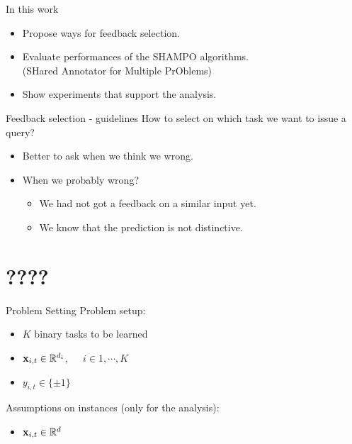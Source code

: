 \documentclass{beamer}
\begin{document}
\begin{frame}{In this work}
\begin{itemize}
\item Propose  ways for feedback selection.   \newline
\item Evaluate  performances of the SHAMPO algorithms. \\
(SHared Annotator for Multiple PrOblems) \newline
\item Show experiments that support the analysis.\newline
\end{itemize}
\end{frame}


\begin{frame}{Feedback selection - guidelines}
How to select on which task we want to issue a query?\newline 
\begin{itemize}
\item Better to ask when we think we wrong.\newline
\item When we probably wrong?\newline
\begin{itemize}
\item We had not got a feedback on a similar input yet.\newline
\item We know  that the prediction is not distinctive.
\end{itemize}
\end{itemize}
\end{frame}

\section{????}

\begin{frame}{Problem Setting}
Problem setup:\newline
\begin{itemize}
\item $K$ binary tasks to be learned \newline
\item $\mathbf{x}_{i,t}\in \mathbb{R}^{d_i}$,~~~$i\in{1,\cdots,K}$\newline
\item $y_{i,t}\in\{\pm1\}$\newline
\end{itemize}
Assumptions on instances (only for the analysis):\newline
\begin{itemize}
\item $\mathbf{x}_{i,t}\in \mathbb{R}^{d}$\newline
\end{itemize}
\end{frame}
\end{document}
